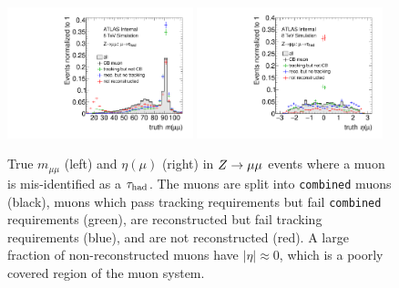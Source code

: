 \begin{figure}[tp]
  \centering
  \includegraphics[width=0.48\textwidth]{figures/tauperformance/muonfakes_mll}
  \includegraphics[width=0.48\textwidth]{figures/tauperformance/muonfakes_eta}
  \caption{True $m_{\mu\mu}$ (left) and $\eta(\mu)$ (right) in $Z \rightarrow \mu\mu$ events where a muon is mis-identified as a $\tau_\text{had}$. The muons are split into \texttt{combined} muons (black), muons which pass tracking requirements but fail \texttt{combined} requirements (green), are reconstructed but fail tracking requirements (blue), and are not reconstructed (red). A large fraction of non-reconstructed muons have $|\eta| \approx 0$, which is a poorly covered region of the muon system.}
  \label{fig:taus-muonfakes1}
\end{figure}

